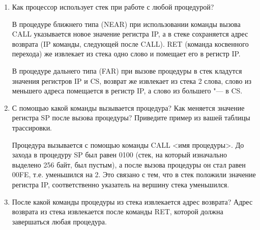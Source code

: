 \documentclass[bachelor, och, otchet]{../SCWorks}
\begin{document}
\begin{enumerate}
\item Как процессор использует стек при работе с любой процедурой?

В процедуре ближнего типа (NEAR) при использовании команды вызова CALL указывается новое значение регистра IP, а в стеке сохраняется адрес возврата (IP команды, следующей после CALL). RET (команда косвенного перехода) же извлекает из стека одно слово и помещает его в регистр IP.

В процедуре дальнего типа (FAR) при вызове процедуры в стек кладутся значения регистров IP и CS, возврат же извлекает из стека 2 слова, слово из меньшего адреса помещается в регистр IP, а слово из большего "--- в CS.

\item С помощью какой команды вызывается процедура? Как меняется значение регистра SP после вызова процедуры? Приведите пример из вашей таблицы трассировки.

Процедура вызывается с помощью команды CALL <имя процедуры>. До захода в процедуру SP был равен 0100 (стек, на который изначально выделено 256 байт, был пустым), а после вызова процедуры он стал равен 00FE, т.е. уменьшился на 2. Это связано с тем, что в стек положили значение регистра IP, соответственно указатель на вершину стека уменьшился.

\item После какой команды процедуры из стека извлекается адрес возврата?
Адрес возврата из стека извлекается после команды RET, которой должна завершаться любая процедура.

\end{enumerate}

\appendix
\end{document}
